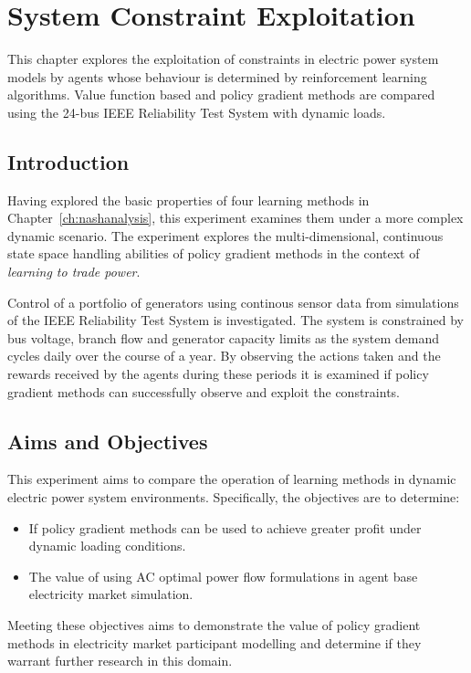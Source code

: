 \chapter{System Constraint Exploitation}
\label{ch:exploitation}
This chapter explores the exploitation of constraints in electric power
system models by agents whose behaviour is determined by reinforcement learning
algorithms.  Value function based and policy gradient methods are compared
using the 24-bus IEEE Reliability Test System with dynamic loads.

\section{Introduction}
Having explored the basic properties of four learning methods in
Chapter~\ref{ch:nashanalysis}, this experiment examines them under a
more complex dynamic scenario.  The experiment explores the multi-dimensional,
continuous state space handling abilities of policy gradient methods in the
context of \textit{learning to trade power}.

Control of a portfolio of generators using continous sensor data from
simulations of the IEEE Reliability Test System \cite{ieee79rts} is
investigated.  The system is constrained by bus voltage, branch flow and generator capacity
limits as the system demand cycles daily over the course of a year. By
observing the actions taken and the rewards received by the agents during these
periods it is examined if policy gradient methods can successfully observe and
exploit the constraints.

\section{Aims and Objectives}
This experiment aims to compare the operation of learning methods in dynamic
electric power system environments.  Specifically, the objectives are to
determine:
\begin{itemize}
  \item If policy gradient methods can be used to achieve greater profit under
  dynamic loading conditions.
  \item The value of using AC optimal power flow formulations in agent base
  electricity market simulation.
\end{itemize}
Meeting these objectives aims to demonstrate the value of policy gradient
methods in electricity market participant modelling and determine if they
warrant further research in this domain.

